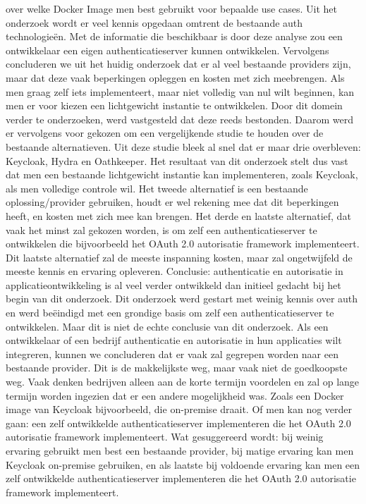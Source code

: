 over welke Docker Image men best gebruikt voor bepaalde use cases.
\newline
\newline
Uit het onderzoek wordt er veel kennis opgedaan omtrent de bestaande \gls{auth} technologieën. Met de informatie die beschikbaar is door deze analyse
zou een ontwikkelaar een eigen authenticatieserver kunnen ontwikkelen. Vervolgens concluderen we uit het huidig onderzoek dat er al veel bestaande 
providers zijn, maar dat deze vaak beperkingen opleggen en kosten met zich meebrengen. Als men graag zelf iets implementeert, maar niet volledig
van nul wilt beginnen, kan men er voor kiezen een lichtgewicht instantie te ontwikkelen. Door dit domein verder te onderzoeken, werd vastgesteld 
dat deze reeds bestonden. Daarom werd er vervolgens voor gekozen om een vergelijkende studie te houden over de bestaande alternatieven. Uit deze
studie bleek al snel dat er maar drie overbleven: Keycloak, Hydra en Oathkeeper. Het resultaat van dit onderzoek stelt dus vast dat men een bestaande
lichtgewicht instantie kan implementeren, zoals Keycloak, als men volledige controle wil. Het tweede alternatief is een bestaande oplossing/provider
gebruiken, houdt er wel rekening mee dat dit beperkingen heeft, en kosten met zich mee kan brengen. Het derde en laatste alternatief, dat vaak het minst zal
gekozen worden, is om zelf een authenticatieserver te ontwikkelen die bijvoorbeeld het OAuth 2.0 autorisatie framework implementeert. Dit laatste alternatief
zal de meeste inspanning kosten, maar zal ongetwijfeld de meeste kennis en ervaring opleveren.
\newline
\newline
Conclusie: authenticatie en autorisatie in applicatieontwikkeling is al veel verder ontwikkeld dan initieel gedacht bij het begin van dit onderzoek.
Dit onderzoek werd gestart met weinig kennis over \gls{auth} en werd beëindigd met een grondige basis om zelf een authenticatieserver te ontwikkelen.
Maar dit is niet de echte conclusie van dit onderzoek. Als een ontwikkelaar of een bedrijf authenticatie en autorisatie in hun applicaties wilt
integreren, kunnen we concluderen dat er vaak zal gegrepen worden naar een bestaande provider. Dit is de makkelijkste weg, maar vaak niet de
goedkoopste weg. Vaak denken bedrijven alleen aan de korte termijn voordelen en zal op lange termijn worden ingezien dat er een andere
mogelijkheid was. Zoals een Docker image van Keycloak bijvoorbeeld, die on-premise draait. Of men kan nog verder gaan: een zelf ontwikkelde
authenticatieserver implementeren die het OAuth 2.0 autorisatie framework implementeert. Wat gesuggereerd wordt: bij weinig ervaring gebruikt men
best een bestaande provider, bij matige ervaring kan men Keycloak on-premise gebruiken, en als laatste bij voldoende ervaring kan men een zelf
ontwikkelde authenticatieserver implementeren die het OAuth 2.0 autorisatie framework implementeert.
